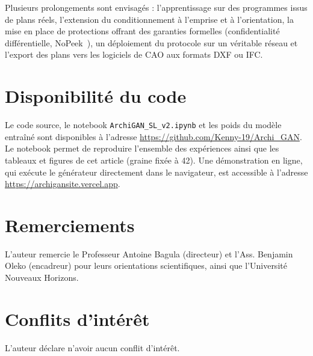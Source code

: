 \documentclass[twocolumn]{ICCKjournal}
\begin{document}
Plusieurs prolongements sont envisagés : l'apprentissage sur des
programmes issus de plans réels, l'extension du conditionnement à
l'emprise et à l'orientation, la mise en place de protections offrant
des garanties formelles (confidentialité différentielle,
NoPeek~\cite{Vepakomma2020NoPeek}), un déploiement du protocole sur un
véritable réseau et l'export des plans vers les logiciels de CAO aux
formats DXF ou IFC.


\section*{Disponibilité du code}

Le code source, le notebook \texttt{ArchiGAN\_SL\_v2.ipynb} et les poids
du modèle entraîné sont disponibles à l'adresse
\url{https://github.com/Kenny-19/Archi_GAN}. Le notebook permet de
reproduire l'ensemble des expériences ainsi que les tableaux et figures
de cet article (graine fixée à 42). Une démonstration en ligne, qui
exécute le générateur directement dans le navigateur, est accessible à
l'adresse \url{https://archigansite.vercel.app}.

\section*{Remerciements}

L'auteur remercie le Professeur Antoine Bagula (directeur) et
l'Ass. Benjamin Oleko (encadreur) pour leurs orientations scientifiques,
ainsi que l'Université Nouveaux Horizons.

\section*{Conflits d'intérêt}

L'auteur déclare n'avoir aucun conflit d'intérêt.



\end{document}
